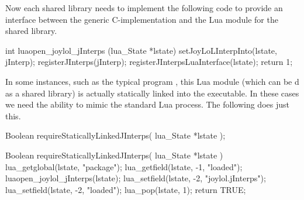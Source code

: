 Now each shared library needs to implement the following code to provide 
an interface between the generic C-implementation and the Lua module for 
the shared library. 

\startCCode
int luaopen_joylol_jInterps (lua_State *lstate) {
  setJoyLoLInterpInto(lstate, jInterp);
  registerJInterps(jInterp);
  registerJInterpsLuaInterface(lstate);
  return 1;
}
\stopCCode

In some instances, such as the typical  program 
, this Lua module (which can be d as a 
shared library) is actually statically linked into the executable. In 
these cases we need the ability to mimic the standard Lua  
process. The following  does just this. 

\startCHeader
Boolean requireStaticallyLinkedJInterps(
  lua_State *lstate
);
\stopCHeader

\startCCode
Boolean requireStaticallyLinkedJInterps(
  lua_State *lstate
) {
  lua_getglobal(lstate, "package");
  lua_getfield(lstate, -1, "loaded");
  luaopen_joylol_jInterps(lstate);
  lua_setfield(lstate, -2, "joylol.jInterps");
  lua_setfield(lstate, -2, "loaded");
  lua_pop(lstate, 1);
  return TRUE;
}
\stopCCode
